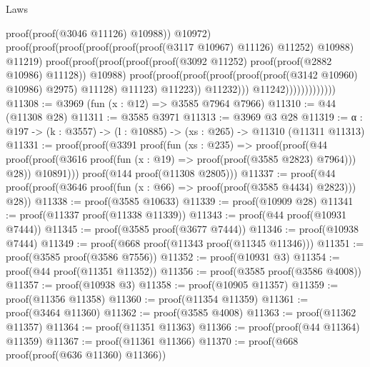 \begin{lexlean}{Laws}
\begin{coremodule}
                                              proof(proof(@3046 @11126) @10988))
                                            @10972)
                                          proof(proof(proof(proof(proof(proof(@3117 @10967) @11126)
                                                    @11252)
                                                  @10988)
                                                @11219)
                                              proof(proof(proof(proof(proof(@3092 @11252)
                                                        proof(proof(@2882 @10986) @11128))
                                                      @10988)
                                                    proof(proof(proof(proof(proof(proof(@3142
                                                                  @10960)
                                                                @10986)
                                                              @2975)
                                                            @11128)
                                                          @11123)
                                                        @11223))
                                                  @11232)))
                                        @11242)))))))))))))
@11308 := @3969 (fun (x : @12) => @3585 @7964 @7966)
@11310 := @44 (@11308 @28)
@11311 := @3585 @3971
@11313 := @3969 @3 @28
@11319 := {α : @197} -> (k : @3557) -> (l : @10885) -> (xs : @265) -> @11310 (@11311 @11313)
@11331 := proof(proof(@3391
        proof(fun (xs : @235) =>
          proof(proof(@44
                proof(proof(@3616 proof(fun (x : @19) => proof(proof(@3585 @2823) @7964))) @28))
              @10891)))
      proof(@144 proof(@11308 @2805)))
@11337 := proof(@44 proof(proof(@3646 proof(fun (x : @66) => proof(proof(@3585 @4434) @2823))) @28))
@11338 := proof(@3585 @10633)
@11339 := proof(@10909 @28)
@11341 := proof(@11337 proof(@11338 @11339))
@11343 := proof(@44 proof(@10931 @7444))
@11345 := proof(@3585 proof(@3677 @7444))
@11346 := proof(@10938 @7444)
@11349 := proof(@668 proof(@11343 proof(@11345 @11346)))
@11351 := proof(@3585 proof(@3586 @7556))
@11352 := proof(@10931 @3)
@11354 := proof(@44 proof(@11351 @11352))
@11356 := proof(@3585 proof(@3586 @4008))
@11357 := proof(@10938 @3)
@11358 := proof(@10905 @11357)
@11359 := proof(@11356 @11358)
@11360 := proof(@11354 @11359)
@11361 := proof(@3464 @11360)
@11362 := proof(@3585 @4008)
@11363 := proof(@11362 @11357)
@11364 := proof(@11351 @11363)
@11366 := proof(proof(@44 @11364) @11359)
@11367 := proof(@11361 @11366)
@11370 := proof(@668 proof(proof(@636 @11360) @11366))

\end{coremodule}
\end{lexlean}
